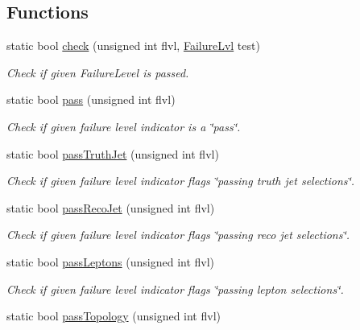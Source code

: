 \subsection*{Functions}
\begin{DoxyCompactItemize}
\item 
static bool \hyperlink{namespaceAnalysis_1_1Select_1_1Event_ae6355636c7fd09c619df02ac9b82ea76}{check} (unsigned int flvl, \hyperlink{namespaceAnalysis_1_1Select_1_1Event_a52c4d90d5d3ef88d9ca5c6a16798cbdb}{Failure\+Lvl} test)
\begin{DoxyCompactList}\small\item\em Check if given {\ttfamily Failure\+Level} is passed. \end{DoxyCompactList}\item 
static bool \hyperlink{namespaceAnalysis_1_1Select_1_1Event_a6b609361cb4fb560e2f8c3e7329f38d0}{pass} (unsigned int flvl)
\begin{DoxyCompactList}\small\item\em Check if given failure level indicator is a \char`\"{}pass\char`\"{}. \end{DoxyCompactList}\item 
static bool \hyperlink{namespaceAnalysis_1_1Select_1_1Event_a19a75502cbbe89bb3bf3b6a847aa081c}{pass\+Truth\+Jet} (unsigned int flvl)
\begin{DoxyCompactList}\small\item\em Check if given failure level indicator flags \char`\"{}passing truth jet selections\char`\"{}. \end{DoxyCompactList}\item 
static bool \hyperlink{namespaceAnalysis_1_1Select_1_1Event_ab14c62eab67d11e0ea5d3f5c9587e58f}{pass\+Reco\+Jet} (unsigned int flvl)
\begin{DoxyCompactList}\small\item\em Check if given failure level indicator flags \char`\"{}passing reco jet selections\char`\"{}. \end{DoxyCompactList}\item 
static bool \hyperlink{namespaceAnalysis_1_1Select_1_1Event_a9536d732c6d6377a8899b30b7569102e}{pass\+Leptons} (unsigned int flvl)
\begin{DoxyCompactList}\small\item\em Check if given failure level indicator flags \char`\"{}passing lepton selections\char`\"{}. \end{DoxyCompactList}\item 
static bool \hyperlink{namespaceAnalysis_1_1Select_1_1Event_a58269c4d9ac0f09f6c46f6185fffc720}{pass\+Topology} (unsigned int flvl)

\end{DoxyCompactItemize}
